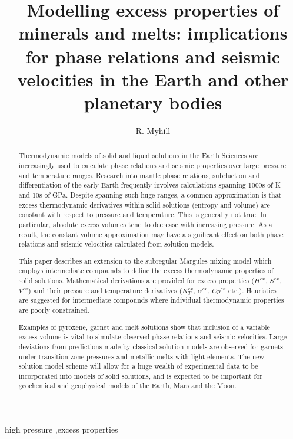 \documentclass[review]{elsarticle}
\begin{document}
\begin{frontmatter}

\title{Modelling excess properties of minerals and melts: implications for phase relations and seismic velocities in the Earth and other planetary bodies}

\author{R. Myhill}
\address{Bayerisches Geoinstitut, Universit\"{a}t Bayreuth, Universit\"{a}tsstrasse 30, 95447 Bayreuth, Germany}

\begin{abstract}
  Thermodynamic models of solid and liquid solutions in the Earth Sciences are increasingly used to calculate phase relations and seismic properties over large pressure and temperature ranges. Research into mantle phase relations, subduction and differentiation of the early Earth frequently involves calculations spanning 1000s of K and 10s of GPa. Despite spanning such huge ranges, a common approximation is that excess thermodynamic derivatives within solid solutions (entropy and volume) are constant with respect to pressure and temperature. This is generally not true. In particular, absolute excess volumes tend to decrease with increasing pressure. As a result, the constant volume approximation may have a significant effect on both phase relations and seismic velocities calculated from solution models.

  This paper describes an extension to the subregular Margules mixing model which employs intermediate compounds to define the excess thermodynamic properties of solid solutions. Mathematical derivations are provided for excess properties ($H^{ex}$, $S^{ex}$, $V^{ex}$) and their pressure and temperature derivatives ($K_T^{ex}$, $\alpha^{ex}$, $Cp^{ex}$ etc.). Heuristics are suggested for intermediate compounds where individual thermodynamic properties are poorly constrained.

Examples of pyroxene, garnet and melt solutions show that inclusion of a variable excess volume is vital to simulate observed phase relations and seismic velocities. Large deviations from predictions made by classical solution models are observed for garnets under transition zone pressures and metallic melts with light elements. The new solution model scheme will allow for a huge wealth of experimental data to be incorporated into models of solid solutions, and is expected to be important for geochemical and geophysical models of the Earth, Mars and the Moon.


\end{abstract}

\begin{keyword}
high pressure \sep excess properties
\end{keyword}

\end{frontmatter}
\end{document}
